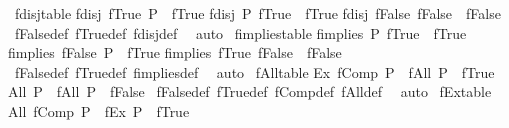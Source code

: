 \begin{isabellebody}
%
\endisadelimproof
\isanewline
{}\isamarkupfalse%
\ fdisj{\isacharunderscore}{\kern0pt}table{\isacharcolon}{\kern0pt}\isanewline
{\isachardoublequoteopen}fdisj\ fTrue\ P\ {\isacharequal}{\kern0pt}\ fTrue{\isachardoublequoteclose}\isanewline
{\isachardoublequoteopen}fdisj\ P\ fTrue\ {\isacharequal}{\kern0pt}\ fTrue{\isachardoublequoteclose}\isanewline
{\isachardoublequoteopen}fdisj\ fFalse\ fFalse\ {\isacharequal}{\kern0pt}\ fFalse{\isachardoublequoteclose}\isanewline
%
\isadelimproof
%
\endisadelimproof
%
\isatagproof
{}\isamarkupfalse%
\ fFalse{\isacharunderscore}{\kern0pt}def\ fTrue{\isacharunderscore}{\kern0pt}def\ fdisj{\isacharunderscore}{\kern0pt}def\ \isamarkupfalse%
\ auto%
\endisatagproof
{\isafoldproof}%
%
\isadelimproof
\isanewline
%
\endisadelimproof
\isanewline
{}\isamarkupfalse%
\ fimplies{\isacharunderscore}{\kern0pt}table{\isacharcolon}{\kern0pt}\isanewline
{\isachardoublequoteopen}fimplies\ P\ fTrue\ {\isacharequal}{\kern0pt}\ fTrue{\isachardoublequoteclose}\isanewline
{\isachardoublequoteopen}fimplies\ fFalse\ P\ {\isacharequal}{\kern0pt}\ fTrue{\isachardoublequoteclose}\isanewline
{\isachardoublequoteopen}fimplies\ fTrue\ fFalse\ {\isacharequal}{\kern0pt}\ fFalse{\isachardoublequoteclose}\isanewline
%
\isadelimproof
%
\endisadelimproof
%
\isatagproof
{}\isamarkupfalse%
\ fFalse{\isacharunderscore}{\kern0pt}def\ fTrue{\isacharunderscore}{\kern0pt}def\ fimplies{\isacharunderscore}{\kern0pt}def\ \isamarkupfalse%
\ auto%
\endisatagproof
{\isafoldproof}%
%
\isadelimproof
\isanewline
%
\endisadelimproof
\isanewline
{}\isamarkupfalse%
\ fAll{\isacharunderscore}{\kern0pt}table{\isacharcolon}{\kern0pt}\isanewline
{\isachardoublequoteopen}Ex\ {\isacharparenleft}{\kern0pt}fComp\ P{\isacharparenright}{\kern0pt}\ {\isasymor}\ fAll\ P\ {\isacharequal}{\kern0pt}\ fTrue{\isachardoublequoteclose}\isanewline
{\isachardoublequoteopen}All\ P\ {\isasymor}\ fAll\ P\ {\isacharequal}{\kern0pt}\ fFalse{\isachardoublequoteclose}\isanewline
%
\isadelimproof
%
\endisadelimproof
%
\isatagproof
{}\isamarkupfalse%
\ fFalse{\isacharunderscore}{\kern0pt}def\ fTrue{\isacharunderscore}{\kern0pt}def\ fComp{\isacharunderscore}{\kern0pt}def\ fAll{\isacharunderscore}{\kern0pt}def\ \isamarkupfalse%
\ auto%
\endisatagproof
{\isafoldproof}%
%
\isadelimproof
\isanewline
%
\endisadelimproof
\isanewline
{}\isamarkupfalse%
\ fEx{\isacharunderscore}{\kern0pt}table{\isacharcolon}{\kern0pt}\isanewline
{\isachardoublequoteopen}All\ {\isacharparenleft}{\kern0pt}fComp\ P{\isacharparenright}{\kern0pt}\ {\isasymor}\ fEx\ P\ {\isacharequal}{\kern0pt}\ fTrue{\isachardoublequoteclose}\isanewline

\end{isabellebody}
